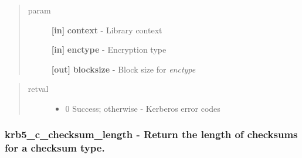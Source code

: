 \documentclass[letterpaper,10pt,english]{sphinxmanual}
\begin{document}
\begin{fulllineitems}
\label{appdev/refs/api/krb5_c_block_size:krb5_c_block_size}
\end{fulllineitems}

\begin{quote}\begin{description}
\item[{param}] \leavevmode
\textbf{{[}in{]}} \textbf{context} - Library context

\textbf{{[}in{]}} \textbf{enctype} - Encryption type

\textbf{{[}out{]}} \textbf{blocksize} - Block size for \emph{enctype}

\end{description}\end{quote}
\begin{quote}\begin{description}
\item[{retval}] \leavevmode\begin{itemize}
\item {} 
0   Success; otherwise - Kerberos error codes

\end{itemize}

\end{description}\end{quote}


\subsubsection{krb5\_c\_checksum\_length -  Return the length of checksums for a checksum type.}
\label{appdev/refs/api/krb5_c_checksum_length:krb5-c-checksum-length-return-the-length-of-checksums-for-a-checksum-type}\label{appdev/refs/api/krb5_c_checksum_length::doc}

\begin{fulllineitems}
\label{appdev/refs/api/krb5_c_checksum_length:krb5_c_checksum_length}
\end{fulllineitems}
\end{document}
